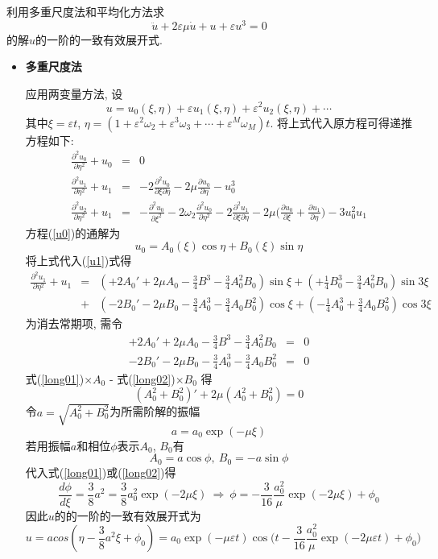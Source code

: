 \begin{problem}[习题7.3]
利用多重尺度法和平均化方法求
\[
\ddot{u}+2\varepsilon\mu\dot{u} + u +\varepsilon u^3 = 0
\]
的解$u$的一阶的一致有效展开式.
\end{problem}

\begin{solution}
\begin{itemize}
\item \textbf{多重尺度法}

应用两变量方法, 设
\[
u=u_0(\xi, \eta)+\varepsilon u_1(\xi, \eta)+\varepsilon^2 u_2(\xi, \eta) + \cdots
\]
其中$\xi = \varepsilon t$, $\eta = (1+\varepsilon^2\omega_2 +\varepsilon^3\omega_3+\cdots + \varepsilon^M\omega_M)t$. 将上式代入原方程可得递推方程如下:
\begin{eqnarray}
\frac{\partial^2u_0}{\partial\eta^2} + u_0 &=& 0\label{u0}\\
\frac{\partial^2u_1}{\partial\eta^2} + u_1 &=& -2\frac{\partial^2u_0}{\partial\xi\partial\eta} - 2\mu\frac{\partial u_0}{\partial\eta} - u_0^3\label{u1}\\
\frac{\partial^2u_2}{\partial\eta^2} + u_1 &=& -\frac{\partial^2u_0}{\partial\xi^2} - 2\omega_2\frac{\partial^2u_0}{\partial\eta^2} -2\frac{\partial^2u_1}{\partial\xi\partial\eta}
-2\mu
\Big(
\frac{\partial u_0}{\partial\xi}+\frac{\partial u_1}{\partial\eta}
\Big)
 - 3u_0^2u_1\label{u2}
\end{eqnarray}
方程(\ref{u0})的通解为
\[
u_0 = A_0(\xi)\cos\eta + B_0(\xi)\sin\eta
\]
将上式代入(\ref{u1})式得
\begin{eqnarray}
\frac{\partial^2u_1}{\partial\eta^2} + u_1 &=& (+2A_0'+2\mu A_0 - \frac{3}{4}B^3-\frac{3}{4}A_0^2B_0)\sin\xi +(+\frac{1}{4}B_0^3-\frac{3}{4}A_0^2B_0)\sin3\xi\nonumber\\
&+& (-2B_0' - 2\mu B_0 -\frac{3}{4}A_0^3-\frac{3}{4}A_0B_0^2)\cos\xi
 + (-\frac{1}{4}A_0^3+\frac{3}{4}A_0B_0^2)\cos3\xi\nonumber
\end{eqnarray}
为消去常期项, 需令
\begin{eqnarray}
+2A_0'+2\mu A_0 - \frac{3}{4}B^3-\frac{3}{4}A_0^2B_0 &=& 0\label{long01}\\
-2B_0' - 2\mu B_0 -\frac{3}{4}A_0^3-\frac{3}{4}A_0B_0^2 &=& 0\label{long02}
\end{eqnarray}
式(\ref{long01})$\times A_0$ - 式(\ref{long02})$\times B_0$ 得
\[
(A_0^2 + B_0^2)' + 2\mu(A_0^2 + B_0^2) = 0
\]
令$a=\sqrt{A_0^2 + B_0^2}$为所需阶解的振幅
\[
a = a_0\exp(-\mu\xi)
\]
若用振幅$a$和相位$\phi$表示$A_0$, $B_0$有
\[
A_0 = a\cos\phi,~ B_0 = -a\sin\phi
\]
代入式(\ref{long01})或(\ref{long02})得
\[
\frac{d\phi}{d\xi} = \frac{3}{8}a^2 =\frac{3}{8}a_0^2\exp(-2\mu\xi)  ~\Rightarrow ~ \phi = -\frac{3}{16}\frac{a_0^2}{\mu}\exp(-2\mu\xi) + \phi_0
\]
因此$u$的的一阶的一致有效展开式为
\[
u = a cos(\eta - \frac{3}{8}a^2\xi + \phi_0)
= a_0\exp(-\mu\varepsilon t)\cos\Big(t- \frac{3}{16}\frac{a_0^2}{\mu}\exp(-2\mu\varepsilon t)+\phi_0\Big)
\]


\end{itemize}
\end{solution}
